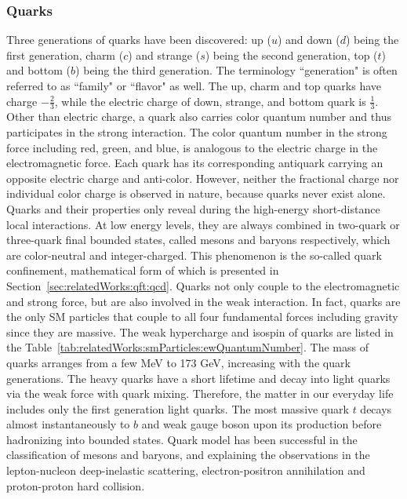 \subsubsection{Quarks} 
Three generations of quarks have been discovered: up ($u$) and down ($d$) being the first generation, charm ($c$) and strange ($s$) being the second generation, top ($t$) and bottom ($b$) being the third generation. The terminology ``generation" is often referred to as ``family" or ``flavor" as well. The up, charm and top quarks have charge $-\frac{2}{3}$, while the electric charge of down, strange, and bottom quark is $\frac{1}{3}$. Other than electric charge, a quark also carries color quantum number and thus participates in the strong interaction. The color quantum number in the strong force including red, green, and blue, is analogous to the electric charge in the electromagnetic force. Each quark has its corresponding antiquark carrying an opposite electric charge and anti-color. However, neither the fractional charge nor individual color charge is observed in nature, because quarks never exist alone. Quarks and their properties only reveal during the high-energy short-distance local interactions. At low energy levels, they are always combined in two-quark or three-quark final bounded states, called mesons and baryons respectively, which are color-neutral and integer-charged. This phenomenon is the so-called quark confinement, mathematical form of which is presented in Section~\ref{sec:relatedWorks:qft:qcd}. Quarks not only couple to the electromagnetic and strong force, but are also involved in the weak interaction. In fact, quarks are the only SM particles that couple to all four fundamental forces including gravity since they are massive. The weak hypercharge and isospin of quarks are listed in the Table~\ref{tab:relatedWorks:smParticles:ewQuantumNumber}. The mass of quarks arranges from a few MeV to 173 GeV, increasing with the quark generations. The heavy quarks have a short lifetime and decay into light quarks via the weak force with quark mixing. Therefore, the matter in our everyday life includes only the first generation light quarks. The most massive quark $t$ decays almost instantaneously to $b$ and weak gauge boson upon its production before hadronizing into bounded states. Quark model has been successful in the classification of mesons and baryons, and explaining the observations in the lepton-nucleon deep-inelastic scattering, electron-positron annihilation and proton-proton hard collision.



